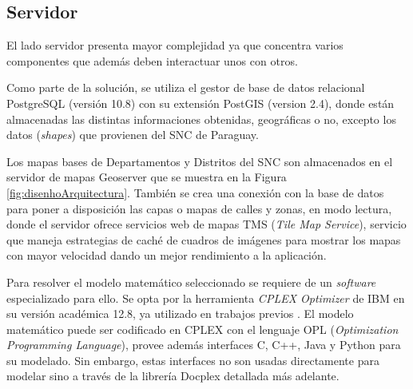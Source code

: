 \subsection{Servidor}

El lado servidor presenta mayor complejidad ya que concentra varios componentes que además deben interactuar unos con otros.

Como parte de la solución, se utiliza el gestor de base de datos relacional PostgreSQL (versión 10.8) con su extensión PostGIS (version 2.4), donde están almacenadas las distintas informaciones obtenidas, geográficas o no, excepto los datos (\textit{shapes}) que provienen del SNC de Paraguay.

Los mapas bases de Departamentos y Distritos del SNC son almacenados en el servidor de mapas Geoserver que se muestra en la Figura \ref{fig:disenhoArquitectura}. También se crea una conexión con la base de datos para poner a disposición las capas o mapas de calles y zonas, en modo lectura, donde el servidor ofrece servicios web de mapas TMS (\textit{Tile Map Service}), servicio que maneja estrategias de caché de cuadros de imágenes para mostrar los mapas con mayor velocidad dando un mejor rendimiento a la aplicación.


Para resolver el modelo matemático seleccionado se requiere de un \textit{software} especializado para ello. Se opta por la herramienta \textit{CPLEX Optimizer} de IBM \citep{CPLEXOptimizer} en su versión académica 12.8, ya utilizado en trabajos previos \citep{Vecchi2016ACollection,Ramos2018TheApproaches,BabaeeTirkolaee2019DevelopingStudy}. El modelo matemático puede ser codificado en CPLEX con el lenguaje OPL ({\textit{Optimization Programming Language}}), provee además interfaces C, C++, Java y Python para su modelado. Sin embargo, estas interfaces no son usadas directamente para modelar sino a través de la librería Docplex \citep{Docplex} detallada más adelante.

